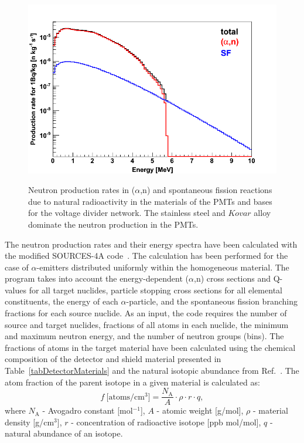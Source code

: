 \begin{figure}[!b]
{\includegraphics[width=0.475\linewidth]{plots/NRalphaN/NeutronProductionMaterials/pmt_Al-ProductionRate_for1Bq.png}
\label{figAlphaNproduction1BqPMT_5}}
\caption[Neutron production rates in ($\alpha$,n) and spontaneous fission reactions due to natural radioactivity in the materials of the PMTs and bases for the voltage divider network]{Neutron production rates in ($\alpha$,n) and spontaneous fission reactions due to natural radioactivity in the materials of the PMTs and bases for the voltage divider network. The stainless steel and $Kovar$ alloy dominate the neutron production in the PMTs.}
\label{figAlphaNproduction1BqPMT}
\end{figure}

The neutron production rates and their energy spectra have been calculated with the modified SOURCES-4A code~\cite{SourcesOriginal, SourcesModified}. The calculation has been performed for the case of $\alpha$-emitters distributed uniformly within the homogeneous  material. The program takes into account the energy-dependent ($\alpha$,n) cross sections and Q-values for all target nuclides, particle stopping cross sections for all elemental constituents, the energy of each $\alpha$-particle, and the spontaneous fission branching fractions for each source nuclide. As an input, the code requires the number of source and target nuclides, fractions of all atoms in each nuclide, the minimum and maximum neutron energy, and the number of neutron groups (bins). The fractions of atoms in the target material have been calculated using the chemical composition of the detector and shield material presented in Table~\ref{tabDetectorMaterials} and the natural isotopic abundance from Ref.~\cite{NuclearData}. The atom fraction of the parent isotope in a given material is calculated as:
\begin{equation}
f\ \text{[atoms/cm$^{3}$]} = \frac{N_{\mathrm{A}}}{A} \cdot \rho \cdot r \cdot q,
\end{equation}
where $N_{\mathrm{A}}$ - Avogadro constant [mol$^{-1}$], $A$ - atomic weight [g/mol], $\rho$ - material density [g/cm$^{3}$], $r$ - concentration of radioactive isotope [ppb mol/mol], $q$ - natural abundance of an isotope.

